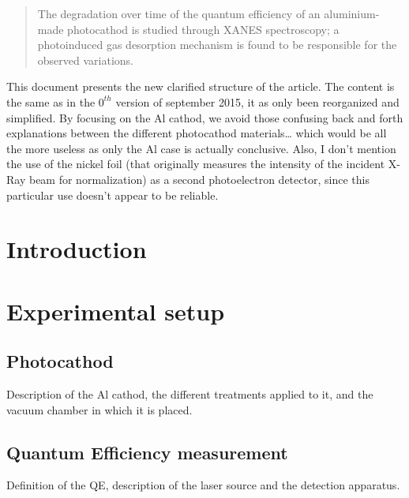 \documentclass[aip,graphicx]{revtex4-1}
\begin{document}
\begin{abstract}
The degradation over time of the quantum efficiency of an aluminium-made photocathod is studied through XANES spectroscopy; a photoinduced gas desorption mechanism is found to be responsible for the observed variations.
\end{abstract}


\maketitle %

This document presents the new clarified structure of the article. The content is the same as in the $0^{th}$ version of september 2015, it as only been reorganized and simplified. By focusing on the Al cathod, we avoid those confusing back and forth explanations between the different photocathod materials… which would be all the more useless as only the Al case is actually conclusive. Also, I don't mention the use of the nickel foil (that originally measures the intensity of the incident X-Ray beam for normalization) as a second photoelectron detector, since this particular use doesn't appear to be reliable.


\section{Introduction}

\section{Experimental setup}

\subsection{Photocathod}
Description of the Al cathod, the different treatments applied to it, and the vacuum chamber in which it is placed.

\subsection{Quantum Efficiency measurement}
Definition of the QE, description of the laser source and the detection apparatus.
\end{document}
